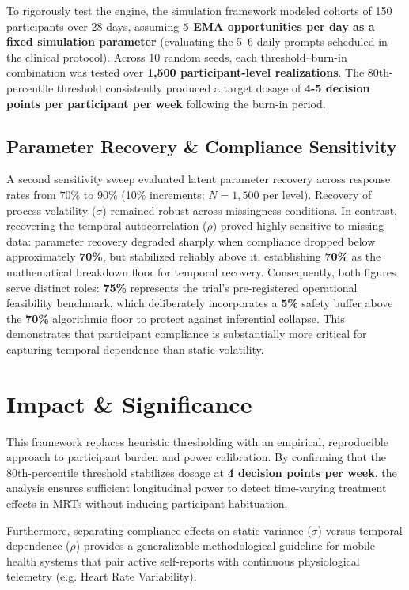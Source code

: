 \documentclass[10pt,letterpaper]{article}
\begin{document}
To rigorously test the engine, the simulation framework modeled cohorts of 150 participants over 28 days, assuming \textbf{5 EMA opportunities per day as a fixed simulation parameter} (evaluating the 5--6 daily prompts scheduled in the clinical protocol). Across 10 random seeds, each threshold--burn-in combination was tested over \textbf{1,500 participant-level realizations}. The 80th-percentile threshold consistently produced a target dosage of \textbf{4-5 decision points per participant per week} following the burn-in period.

\subsection{Parameter Recovery \& Compliance Sensitivity}

A second sensitivity sweep evaluated latent parameter recovery across response rates from $70\%$ to $90\%$ (10\% increments; $N=1,500$ per level). Recovery of process volatility ($\sigma$) remained robust across missingness conditions. In contrast, recovering the temporal autocorrelation ($\rho$) proved highly sensitive to missing data: parameter recovery degraded sharply when compliance dropped below approximately \textbf{70\%}, but stabilized reliably above it, establishing \textbf{70\%} as the mathematical breakdown floor for temporal recovery. Consequently, both figures serve distinct roles: \textbf{75\%} represents the trial's pre-registered operational feasibility benchmark, which deliberately incorporates a \textbf{5\%} safety buffer above the \textbf{70\%} algorithmic floor to protect against inferential collapse. This demonstrates that participant compliance is substantially more critical for capturing temporal dependence than static volatility.

\section{Impact \& Significance}

This framework replaces heuristic thresholding with an empirical, reproducible approach to participant burden and power calibration. By confirming that the 80th-percentile threshold stabilizes dosage at \textbf{4 decision points per week}, the analysis ensures sufficient longitudinal power to detect time-varying treatment effects in MRTs without inducing participant habituation. 

Furthermore, separating compliance effects on static variance ($\sigma$) versus temporal dependence ($\rho$) provides a generalizable methodological guideline for mobile health systems that pair active self-reports with continuous physiological telemetry (e.g. Heart Rate Variability).
\end{document}

